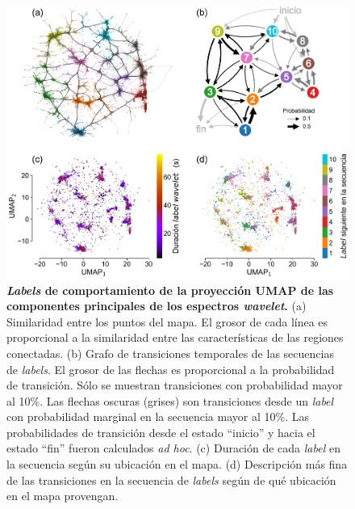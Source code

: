 \begin{figure}[htbp]
    \centering
    \includegraphics[width=0.99\linewidth]{figuras/capitulo4/labels_umap_wav.png}
    \caption{\textbf{\textit{Labels} de comportamiento de la proyección UMAP de las componentes principales de los espectros \textit{wavelet}.}
        (a) Similaridad entre los puntos del mapa. El grosor de cada línea es proporcional a la similaridad entre las características de las regiones conectadas. (b) Grafo de transiciones temporales de las secuencias de \textit{labels}. El grosor de las flechas es proporcional a la probabilidad de transición. Sólo se muestran transiciones con probabilidad mayor al 10\%. Las flechas oscuras (grises) son transiciones desde un \textit{label} con probabilidad marginal en la secuencia mayor al 10\%. Las probabilidades de transición desde el estado ``inicio'' y hacia el estado ``fin'' fueron calculados \textit{ad hoc}. (c) Duración de cada \textit{label} en la secuencia según su ubicación en el mapa. (d) Descripción más fina de las transiciones en la secuencia de \textit{labels} según de qué ubicación en el mapa provengan.}
    \label{fig:capitulo4_labels_umap_wav}
\end{figure}

